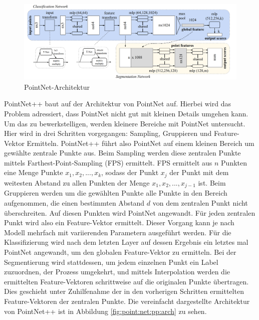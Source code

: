 \documentclass[12pt,titlepage, twoside]{article}
\begin{document}
\begin{figure}
    \centering
    \includegraphics[width=1.0\textwidth]{./Images/PointNetArchitektur.png}
    \caption{PointNet-Architektur \cite{qi2017pointnet}}
    \label{fig:point:net:arch}
\end{figure}

PointNet++ baut auf der Architektur von PointNet auf. Hierbei wird das Problem adressiert, dass PointNet nicht gut mit kleinen Details umgehen kann. 
Um das zu bewerkstelligen, werden kleinere Bereiche mit PointNet untersucht. Hier wird in drei Schritten vorgegangen: Sampling, Gruppieren und Feature-Vektor Ermitteln.
PointNet++ führt also PointNet auf einem kleinen Bereich um gewählte zentrale Punkte aus. Beim Sampling werden diese zentralen Punkte mittels Farthest-Point-Sampling (FPS) ermittelt. 
FPS ermittelt aus $n$ Punkten eine Menge Punkte ${x_1,x_2,...,x_k}$, sodass der Punkt $x_j$ der Punkt mit dem weitesten Abstand zu allen Punkten der Menge ${x_1,x_2,...,x_{j-1}}$ ist.
Beim Gruppieren werden um die gewählten Punkte alle Punkte in den Bereich aufgenommen, die einen bestimmten Abstand $d$ von dem zentralen Punkt nicht überschreiten. 
Auf diesen Punkten wird PointNet angewandt. Für jeden zentralen Punkt wird also ein Feature-Vektor ermittelt.
Dieser Vorgang kann je nach Modell mehrfach mit variierenden Parametern ausgeführt werden. 
Für die Klassifizierung wird nach dem letzten Layer auf dessen Ergebnis ein letztes mal PointNet angewandt, um den globalen Feature-Vektor zu ermitteln.
Bei der Segmentierung wird stattdessen, um jedem einzelnen Punkt ein Label zuzuordnen, der Prozess umgekehrt, und mittels Interpolation werden die ermittelten Feature-Vektoren schrittweise auf die originalen Punkte 
übertragen. Dies geschieht unter Zuhilfenahme der in den vorherigen Schritten ermittelten Feature-Vektoren der zentralen Punkte.
Die vereinfacht dargestellte Architektur von PointNet++ ist in Abbildung \ref{fig:point:net:pp:arch} zu sehen.
\end{document}
